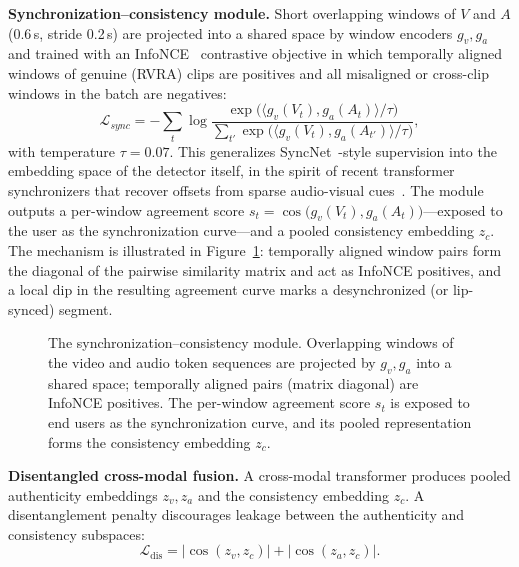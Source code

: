 \textbf{Synchronization--consistency module.} Short overlapping windows of $V$
and $A$ (0.6\,s, stride 0.2\,s) are projected into a shared space by window
encoders $g_v, g_a$ and trained with an InfoNCE~\cite{oord2018infonce}
contrastive objective in which temporally aligned windows of genuine (RVRA)
clips are positives and all misaligned or cross-clip windows in the batch are
negatives:
\begin{equation}
  \mathcal{L}_{sync} = -\sum_{t} \log
  \frac{\exp\!\big(\langle g_v(V_t), g_a(A_t)\rangle / \tau\big)}
       {\sum_{t'} \exp\!\big(\langle g_v(V_t), g_a(A_{t'})\rangle / \tau\big)},
\end{equation}
with temperature $\tau{=}0.07$. This generalizes
SyncNet~\cite{chung2016syncnet}-style supervision into the embedding space of
the detector itself, in the spirit of recent transformer synchronizers that
recover offsets from sparse audio-visual cues~\cite{iashin2024synchformer}. The module outputs a per-window agreement score
$s_t = \cos\big(g_v(V_t), g_a(A_t)\big)$---exposed to the user as the
synchronization curve---and a pooled consistency embedding $z_c$. The
mechanism is illustrated in Figure~\ref{fig:sync}: temporally aligned
window pairs form the diagonal of the pairwise similarity matrix and act as
InfoNCE positives, and a local dip in the resulting agreement curve marks a
desynchronized (or lip-synced) segment.

\begin{figure}[htbp]
  \centering
  
  \caption{The synchronization--consistency module. Overlapping windows of
  the video and audio token sequences are projected by $g_v, g_a$ into a
  shared space; temporally aligned pairs (matrix diagonal) are InfoNCE
  positives. The per-window agreement score $s_t$ is exposed to end users
  as the synchronization curve, and its pooled representation forms the
  consistency embedding $z_c$.}
  \label{fig:sync}
\end{figure}

\textbf{Disentangled cross-modal fusion.} A cross-modal transformer produces
pooled authenticity embeddings $z_v, z_a$ and the consistency embedding $z_c$.
A disentanglement penalty discourages leakage between the authenticity and
consistency subspaces:
\begin{equation}
  \mathcal{L}_{\text{dis}} = \left|\cos(z_v, z_c)\right| + \left|\cos(z_a, z_c)\right|.
\end{equation}

